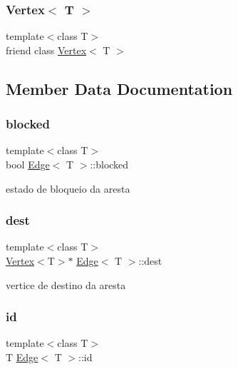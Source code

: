 \subsubsection{\texorpdfstring{Vertex$<$ T $>$}{Vertex< T >}}
{\footnotesize\ttfamily template$<$class T$>$ \\
friend class \mbox{\hyperlink{class_vertex}{Vertex}}$<$ T $>$\hspace{0.3cm}{\ttfamily [friend]}}



\subsection{Member Data Documentation}
\mbox{\label{class_edge_ad6ef308f0a89198b588a98055b8edc33}} 
\subsubsection{\texorpdfstring{blocked}{blocked}}
{\footnotesize\ttfamily template$<$class T$>$ \\
bool \mbox{\hyperlink{class_edge}{Edge}}$<$ T $>$\+::blocked\hspace{0.3cm}{\ttfamily [private]}}

estado de bloqueio da aresta \mbox{\label{class_edge_ae4d65678b91bd9d814af4720ad87cd0c}} 
\subsubsection{\texorpdfstring{dest}{dest}}
{\footnotesize\ttfamily template$<$class T$>$ \\
\mbox{\hyperlink{class_vertex}{Vertex}}$<$T$>$$\ast$ \mbox{\hyperlink{class_edge}{Edge}}$<$ T $>$\+::dest\hspace{0.3cm}{\ttfamily [private]}}

vertice de destino da aresta \mbox{\label{class_edge_af64ff5794c079dcb6af0986cd404185c}} 
\subsubsection{\texorpdfstring{id}{id}}
{\footnotesize\ttfamily template$<$class T$>$ \\
T \mbox{\hyperlink{class_edge}{Edge}}$<$ T $>$\+::id\hspace{0.3cm}{\ttfamily [private]}}

